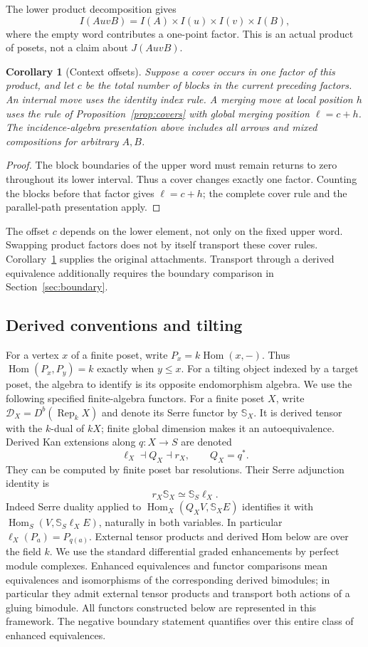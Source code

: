 \documentclass[11pt]{article}
\newtheorem{corollary}[theorem]{Corollary}
\theoremstyle{definition}
\newcommand{\Rep}{\operatorname{Rep}}
\newcommand{\Hom}{\operatorname{Hom}}
\newcommand{\Db}{D^b}
\begin{document}
The lower product decomposition gives
\[
 I(AuvB)=I(A)\times I(u)\times I(v)\times I(B),
\]
where the empty word contributes a one-point factor. This is an
actual product of posets, not a claim about $J(AuvB)$.
\begin{corollary}[Context offsets]\label{cor:context}
Suppose a cover occurs in one factor of this product, and let $c$
be the total number of blocks in the current preceding factors.
An internal move uses the identity index rule. A merging move at
local position $h$ uses the rule of Proposition~\ref{prop:covers}
with global merging position $\ell=c+h$. The incidence-algebra
presentation above includes all arrows and mixed compositions for
arbitrary $A,B$.
\end{corollary}
\begin{proof}
The block boundaries of the upper word must remain returns to zero
throughout its lower interval. Thus a cover changes exactly one
factor. Counting the blocks before that factor gives $\ell=c+h$;
the complete cover rule and the parallel-path presentation apply.
\end{proof}
The offset $c$ depends on the lower element, not only on the fixed
upper word. Swapping product factors does not by itself transport
these cover rules. Corollary~\ref{cor:context} supplies the original
attachments. Transport through a derived equivalence additionally
requires the boundary comparison in Section~\ref{sec:boundary}.


\subsection{Derived conventions and tilting}
For a vertex $x$ of a finite poset, write
$P_x=k\operatorname{Hom}(x,-)$. Thus
$\operatorname{Hom}(P_x,P_y)=k$ exactly when $y\leq x$.
For a tilting object indexed by a target poset, the algebra to identify
is its opposite endomorphism algebra. We use the following specified
finite-algebra functors. For a finite poset $X$, write
$\mathcal D_X=\Db(\Rep_k X)$ and denote its Serre functor by
$\mathbb S_X$. It is derived tensor with the $k$-dual of $kX$;
finite global dimension makes it an autoequivalence. Derived
Kan extensions along $q:X\to S$ are denoted
\[
 \ell_X\dashv Q_X\dashv r_X,\qquad Q_X=q^*.
\]
They can be computed by finite poset bar resolutions. Their Serre
adjunction identity is
\begin{equation}\label{eq:serre-adjoint}
 r_X\mathbb S_X\simeq\mathbb S_S\ell_X.
\end{equation}
Indeed Serre duality applied to
$\Hom_X(Q_X V,\mathbb S_X E)$ identifies it with
$\Hom_S(V,\mathbb S_S\ell_X E)$, naturally in both variables.
In particular $\ell_X(P_a)=P_{q(a)}$. External tensor products
and derived Hom below are over the field $k$.
We use the standard differential graded enhancements by perfect
module complexes. Enhanced equivalences and functor comparisons
mean equivalences and isomorphisms of the corresponding derived
bimodules; in particular they admit external tensor products and
transport both actions of a gluing bimodule. All functors constructed
below are represented in this framework. The negative boundary
statement quantifies over this entire class of enhanced equivalences.
\end{document}
